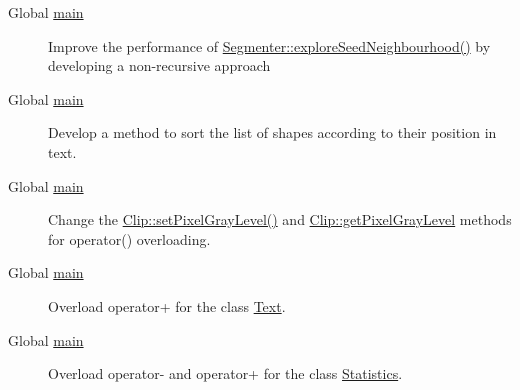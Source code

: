 \label{todo__todo000001}
\hypertarget{todo__todo000001}{}
 \begin{description}
\item[Global \hyperlink{main_8cpp_bf9e6b7e6f15df4b525a2e7705ba3089}{main} ]Improve the performance of \hyperlink{class_segmenter_684df74b0e810a837669823c47b6ed87}{Segmenter::exploreSeedNeighbourhood()} by developing a non-recursive approach \end{description}


\label{todo__todo000001}
\hypertarget{todo__todo000001}{}
 \begin{description}
\item[Global \hyperlink{main_8cpp_bf9e6b7e6f15df4b525a2e7705ba3089}{main} ]Develop a method to sort the list of shapes according to their position in text. \end{description}


\label{todo__todo000001}
\hypertarget{todo__todo000001}{}
 \begin{description}
\item[Global \hyperlink{main_8cpp_bf9e6b7e6f15df4b525a2e7705ba3089}{main} ]Change the \hyperlink{class_clip_454ff6070d0918e56a09a3f28ff430c3}{Clip::setPixelGrayLevel()} and \hyperlink{class_clip_85d16f086803860fae205c48161a3c38}{Clip::getPixelGrayLevel} methods for operator() overloading. \end{description}


\label{todo__todo000001}
\hypertarget{todo__todo000001}{}
 \begin{description}
\item[Global \hyperlink{main_8cpp_bf9e6b7e6f15df4b525a2e7705ba3089}{main} ]Overload operator+ for the class \hyperlink{class_text}{Text}. \end{description}


\label{todo__todo000001}
\hypertarget{todo__todo000001}{}
 \begin{description}
\item[Global \hyperlink{main_8cpp_bf9e6b7e6f15df4b525a2e7705ba3089}{main} ]Overload operator- and operator+ for the class \hyperlink{class_statistics}{Statistics}.

\end{description}
